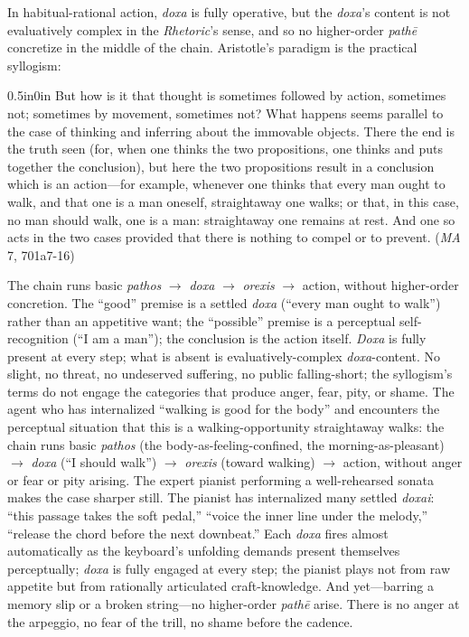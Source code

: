 In habitual-rational action, \textit{doxa} is fully operative, but the \textit{doxa}'s content is not evaluatively complex in the \textit{Rhetoric}'s sense, and so no higher-order \textit{pathē} concretize in the middle of the chain. Aristotle's paradigm is the practical syllogism:
\begin{adjustwidth}{0.5in}{0in}
But how is it that thought is sometimes followed by action, sometimes not; sometimes by movement, sometimes not? What happens seems parallel to the case of thinking and inferring about the immovable objects. There the end is the truth seen (for, when one thinks the two propositions, one thinks and puts together the conclusion), but here the two propositions result in a conclusion which is an action---for example, whenever one thinks that every man ought to walk, and that one is a man oneself, straightaway one walks; or that, in this case, no man should walk, one is a man: straightaway one remains at rest. And one so acts in the two cases provided that there is nothing to compel or to prevent. (\textit{MA} 7, 701a7-16)
\end{adjustwidth}
The chain runs basic \textit{pathos} $\rightarrow$ \textit{doxa} $\rightarrow$ \textit{orexis} $\rightarrow$ action, without higher-order concretion. The ``good'' premise is a settled \textit{doxa} (``every man ought to walk'') rather than an appetitive want; the ``possible'' premise is a perceptual self-recognition (``I am a man''); the conclusion is the action itself. \textit{Doxa} is fully present at every step; what is absent is evaluatively-complex \textit{doxa}-content. No slight, no threat, no undeserved suffering, no public falling-short; the syllogism's terms do not engage the categories that produce anger, fear, pity, or shame. The agent who has internalized ``walking is good for the body'' and encounters the perceptual situation that this is a walking-opportunity straightaway walks: the chain runs basic \textit{pathos} (the body-as-feeling-confined, the morning-as-pleasant) $\rightarrow$ \textit{doxa} (``I should walk'') $\rightarrow$ \textit{orexis} (toward walking) $\rightarrow$ action, without anger or fear or pity arising. The expert pianist performing a well-rehearsed sonata makes the case sharper still. The pianist has internalized many settled \textit{doxai}: ``this passage takes the soft pedal,'' ``voice the inner line under the melody,'' ``release the chord before the next downbeat.'' Each \textit{doxa} fires almost automatically as the keyboard's unfolding demands present themselves perceptually; \textit{doxa} is fully engaged at every step; the pianist plays not from raw appetite but from rationally articulated craft-knowledge. And yet---barring a memory slip or a broken string---no higher-order \textit{pathē} arise. There is no anger at the arpeggio, no fear of the trill, no shame before the cadence.

